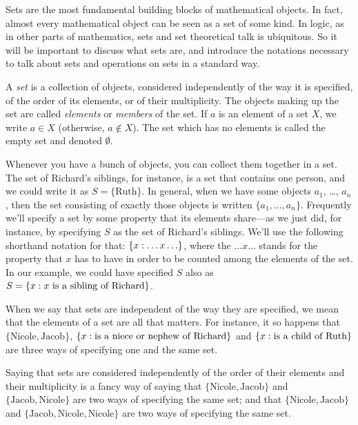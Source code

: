 \documentclass[../../include/open-logic-section]{subfiles}
\begin{document}

\begin{explain}
Sets are the most fundamental building blocks of mathematical
objects. In fact, almost every mathematical object can be seen as a
set of some kind.  In logic, as in other parts of mathematics, sets
and set theoretical talk is ubiquitous.  So it will be important to
discuss what sets are, and introduce the notations necessary to talk
about sets and operations on sets in a standard way.
\end{explain}

\begin{defn}
A \emph{set} is a collection of objects, considered independently of
the way it is specified, of the order of its elements, or of their
multiplicity. The objects making up the set are called \emph{elements}
or \emph{members} of the set. If $a$ is an element of a set $X$, we
write $a \in X$ (otherwise, $a \notin X$). The set which has no elements
is called the empty set and denoted $\emptyset$.
\end{defn}

\begin{ex}
Whenever you have a bunch of objects, you can collect them together in
a set. The set of Richard's siblings, for instance, is a set that
contains one person, and we could write it as $S=\{\textrm{Ruth}\}$.
In general, when we have some objects $a_{1}$, \dots, $a_{n}$, then
the set consisting of exactly those objects is written $\{
a_{1}, \dots, a_{n}\}$.  Frequently we'll specify a set by some
property that its elements share---as we just did, for instance, by
specifying $S$ as the set of Richard's siblings. We'll use the
following shorthand notation for that: $\{ x : \ldots x\ldots \}$,
where the $\ldots x\ldots$ stands for the property that $x$ has to
have in order to be counted among the elements of the set. In our
example, we could have specified $S$ also as $S = \{ x : x \text{ is
a sibling of Richard} \}$. 
\end{ex}

\begin{explain}
When we say that sets are independent of the way they are specified,
we mean that the elements of a set are all that matters. For instance,
it so happens that $\{\text{Nicole}, \text{Jacob}\}$,
$\{ x : \text{is a niece or nephew of Richard} \}$ and
$\{ x : \text{is a child of Ruth} \}$ are three ways of specifying
one and the same set.

Saying that sets are considered independently of the order of their
elements and their multiplicity is a fancy way of saying that
$\{\text{Nicole}, \text{Jacob}\}$ and $\{\text{Jacob},
\text{Nicole}\}$ are two ways of specifying the same set; and that
$\{\text{Nicole}, \text{Jacob}\}$ and $\{\text{Jacob}, \text{Nicole},
\text{Nicole}\}$ are two ways of specifying the same set.
\end{explain}
\end{document}
